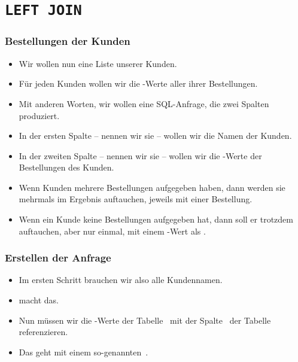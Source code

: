 \documentclass[aspectratio=169,mathserif,notheorems]{beamer}%
\begin{document}
\section{\texttt{LEFT JOIN}}%
%
\begin{frame}%
\frametitle{Bestellungen der Kunden}%
\begin{itemize}%
\item Wir wollen nun eine Liste unserer Kunden.%
\item<2-> Für jeden Kunden wollen wir die -Werte aller ihrer Bestellungen.%
\item<3-> Mit anderen Worten, wir wollen eine SQL-Anfrage, die zwei Spalten produziert.%
\item<4-> In der ersten Spalte -- nennen wir sie  -- wollen wir die Namen der Kunden.%
\item<5-> In der zweiten Spalte -- nennen wir sie  -- wollen wir die -Werte der Bestellungen des Kunden.%
\item<6-> Wenn Kunden mehrere Bestellungen aufgegeben haben, dann werden sie mehrmals im Ergebnis auftauchen, jeweils mit einer Bestellung.%
\item<7-> Wenn ein Kunde keine Bestellungen aufgegeben hat, dann soll er trotzdem auftauchen, aber nur einmal, mit einem -Wert als .%
\end{itemize}%
\end{frame}%
%
\begin{frame}%
\frametitle{Erstellen der Anfrage}%
\begin{itemize}%
\item Im ersten Schritt brauchen wir also alle Kundennamen.%
\item<2->  macht das.%
\item<3-> Nun müssen wir die -Werte der Tabelle~ mit der Spalte~ der Tabelle~ referenzieren.%
\item<4-> Das geht mit einem so-genannten~\cite{PGDG:PD:JT}.%
\end{itemize}%
\end{frame}%
%
\end{document}
